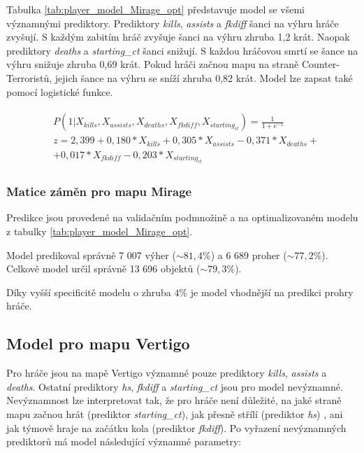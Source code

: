 

{\color{red}
Tabulka \ref{tab:player_model_Mirage_opt} představuje model se všemi významnými prediktory. Prediktory \textit{kills}, \textit{assists} a \textit{fkdiff} šanci na výhru
hráče zvyšují. S každým zabitím hráč zvyšuje šanci na výhru zhruba 1,2 krát. Naopak prediktory \textit{deaths} a \textit{starting\_ct} šanci snižují. S každou hráčovou smrtí
se šance na výhru snižuje zhruba 0,69 krát. Pokud hráči začnou mapu na straně Counter-Terroristů, jejich šance na výhru se sníží zhruba 0,82 krát. 
Model lze zapsat také pomocí logistické funkce.
}

\begin{align}
    \begin{split}
        &P(1 | X_{kills}, X_{assists}, X_{deaths}, X_{fkdiff}, X_{starting_{ct}}) = \frac{1}{1 + e^{-z}} \\
        &z = 2,399 + 0,180*X_{kills} + 0,305*X_{assists} - 0,371*X_{deaths} + \\
        &+ 0,017*X_{fkdiff} - 0,203*X_{starting_{ct}}
    \end{split}
    \label{eq:player_funkce_Mirage}
\end{align}

\subsubsection{Matice záměn pro mapu Mirage}
Predikce jsou provedené na validačním podmnožině a na optimalizovaném modelu z tabulky \ref{tab:player_model_Mirage_opt}.



Model predikoval správně 7 007 výher 
{\color{red}
($\sim 81,4\%$)
}
a 6 689 proher
{\color{red}
($\sim 77,2\%$). Celkově model určil správně 13 696 objektů ($\sim 79,3\%$).
}



{\color{red}
Díky vyšší specificitě modelu o zhruba $4\%$ je model vhodnější na predikci prohry hráče.
}

\subsection{Model pro mapu Vertigo}



Pro hráče jsou na mapě Vertigo významné pouze prediktory \textit{kills}, \textit{assists} a \textit{deaths}. Ostatní prediktory \textit{hs}, \textit{fkdiff} a \textit{starting\_ct}
jsou pro model nevýznamné. Nevýznamnost lze interpretovat tak, že pro hráče není důležité, na jaké straně mapu začnou hrát (prediktor  \textit{starting\_ct}), jak přesně
střílí (prediktor \textit{hs})
{\color{red}
, ani jak týmově hraje na začátku kola (prediktor \textit{fkdiff}).
}
Po vyřazení nevýznamných prediktorů má model následující významné parametry:

